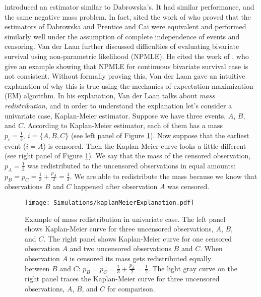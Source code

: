 \documentclass[]{article}
\begin{document}
\cite{prentice1992covariance} introduced an estimator similar to Dabrowska's. It had similar performance, and the same negative mass problem. In fact, \cite{van1997nonparametric} sited the work of \cite{gill1990survey} who proved that the estimators of Dabrowska and Prentice and Cai were equivalent and performed similarly well under the assumption of complete independence of events and censoring. Van der Laan further discussed difficulties of evaluating bivariate survival using non-parametric likelihood (NPMLE). He cited the work of \cite{tsai1986nonparametric}, who give an example showing that NPMLE for continuous bivariate survival case is not consistent. Without formally proving this, Van der Laan gave an intuitive explanation of why this is true using the mechanics of expectation-maximization (EM) algorithm. In his explanation, Van der Laan talks about \emph{mass redistribution}, and in order to understand the explanation let's consider a univariate case, Kaplan-Meier estimator. Suppose we have three events, $A$, $B$, and $C$. According to Kaplan-Meier estimator, each of them has a mass $p_i = \frac{1}{3},~i = \{A,B,C\}$ (see left panel of Figure \ref{fig:km}). Now suppose that the earliest event ($i=A$) is censored. Then the Kaplan-Meier curve looks a little different (see right panel of Figure \ref{fig:km}). We say that the mass of the censored observation, $p_A=\frac{1}{3}$ was redistributed to the uncensored observations in equal amounts: $p_B=p_C=\frac{1}{3}+\frac{p_A}{2} = \frac{1}{2}$. We are able to redistribute the mass because we know that observations $B$ and $C$ happened after observation $A$ was censored.\\

\begin{figure}[!h]
\caption[Example of mass redistribution in univariate case.]{Example of mass redistribution in univariate case. The left panel shows Kaplan-Meier curve for three uncensored observations, $A$, $B$, and $C$. The right panel shows Kaplan-Meier curve for one censored observation $A$ and two uncensored observations $B$ and $C$. When observation $A$ is censored its mass gets redistributed equally between $B$ and $C$: $p_B=p_C=\frac{1}{3}+\frac{p_A}{2} = \frac{1}{2}$. The light gray curve on the right panel traces the Kaplan-Meier curve for three uncensored observations, $A$, $B$, and $C$ for comparison.}
\texttt{[image: Simulations/kaplanMeierExplanation.pdf]}
\label{fig:km}
\end{figure}
\end{document}
